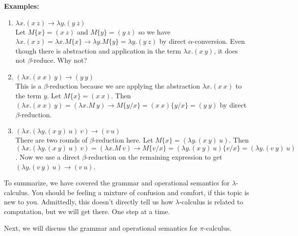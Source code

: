 \documentclass[12pt]{article}
\numberwithin{equation}{section}
\begin{document}
\noindent \textbf{Examples:}
\begin{enumerate}
\item $\lambda x. (x \ z) \rightarrow \lambda y. (y \ z)$ \\
Let $M\{x\}=( x \ z)$ and $M\{y\}=(y \ z)$ so we have $\lambda x. (x \ z) = \lambda x. M\{x\} \rightarrow \lambda y. M\{y\} = \lambda y. (y \ z)$ by direct $\alpha$-conversion. Even though there is abstraction and application in the term $\lambda x. (x \ y)$, it does not $\beta$-reduce. Why not?

\item $(\lambda x.(x \ x) \ y) \rightarrow (y \ y)$ \\
This is a $\beta$-reduction because we are applying the abstraction $\lambda x.(x \ x)$ to the term $y$. Let $M\{x\}=(x \ x)$. Then $(\lambda x.(x \ x) \ y) = (\lambda x. M \ y) \rightarrow M\{y / x\}=(x \ x)\{ y / x \}=(y \ y)$ by direct $\beta$-reduction.

\item $(\lambda x. (\lambda y. (x \ y) \ u) \ v) \rightarrow (v \ u)$ \\
There are two rounds of $\beta$-reduction here. Let $M\{ x \}=(\lambda y.( x \ y) \ u)$. Then $(\lambda x. (\lambda y.( x \ y) \ u) \ v) = (\lambda x. M \ v) \rightarrow M\{ v / x \}=(\lambda y. ( x \ y) \ u)\{v / x \}=(\lambda y.( v \ y) \ u)$. Now we use a direct $\beta$-reduction on the remaining expression to get $(\lambda y. (v \ y) \ u) \rightarrow (v \ u)$. 
\end{enumerate}

To summarize, we have covered the grammar and operational semantics for $\lambda$-calculus. You should be feeling a mixture of confusion and comfort, if this topic is new to you. Admittedly, this doesn't directly tell us how $\lambda$-calculus is related to computation, but we will get there. One step at a time.

Next, we will discuss the grammar and operational semantics for $\pi$-calculus.

\end{document}
